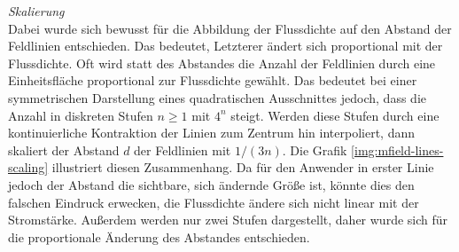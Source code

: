 \textit{Skalierung}\\
Dabei wurde sich bewusst für die Abbildung der Flussdichte auf den Abstand der Feldlinien entschieden. Das bedeutet, Letzterer ändert sich proportional mit der Flussdichte. Oft wird statt des Abstandes die Anzahl der Feldlinien durch eine Einheitsfläche proportional zur Flussdichte gewählt. Das bedeutet bei einer symmetrischen Darstellung eines quadratischen Ausschnittes jedoch, dass die Anzahl in diskreten Stufen $n \geq 1$ mit $4^{n}$ steigt. Werden diese Stufen durch eine kontinuierliche Kontraktion der Linien zum Zentrum hin interpoliert, dann skaliert der Abstand $d$ der Feldlinien mit $1/(3n)$. Die Grafik \ref{img:mfield-lines-scaling} illustriert diesen Zusammenhang. Da für den Anwender in erster Linie jedoch der Abstand die sichtbare, sich ändernde Größe ist, könnte dies den falschen Eindruck erwecken, die Flussdichte ändere sich nicht linear mit der Stromstärke. Außerdem werden nur zwei Stufen dargestellt, daher wurde sich für die proportionale Änderung des Abstandes entschieden.\\

\vspace{4px}
\begin{center}
	\\
\end{center}
\vspace{6px}

